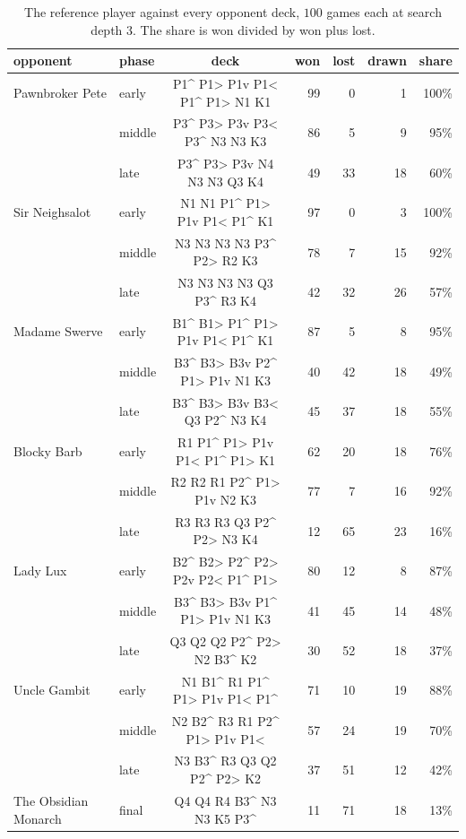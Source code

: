 \documentclass[11pt,a4paper]{article}
\begin{document}
\begin{table}[ht]
\centering
\small
\begin{tabular}{llcrrrr}
\toprule
opponent & phase & deck & won & lost & drawn & share \\
\midrule
Pawnbroker Pete & early & P1\^{} P1> P1v P1< P1\^{} P1> N1 K1 & 99 & 0 & 1 & 100\% \\
 & middle & P3\^{} P3> P3v P3< P3\^{} N3 N3 K3 & 86 & 5 & 9 & 95\% \\
 & late & P3\^{} P3> P3v N4 N3 N3 Q3 K4 & 49 & 33 & 18 & 60\% \\
\addlinespace
Sir Neighsalot & early & N1 N1 P1\^{} P1> P1v P1< P1\^{} K1 & 97 & 0 & 3 & 100\% \\
 & middle & N3 N3 N3 N3 P3\^{} P2> R2 K3 & 78 & 7 & 15 & 92\% \\
 & late & N3 N3 N3 N3 Q3 P3\^{} R3 K4 & 42 & 32 & 26 & 57\% \\
\addlinespace
Madame Swerve & early & B1\^{} B1> P1\^{} P1> P1v P1< P1\^{} K1 & 87 & 5 & 8 & 95\% \\
 & middle & B3\^{} B3> B3v P2\^{} P1> P1v N1 K3 & 40 & 42 & 18 & 49\% \\
 & late & B3\^{} B3> B3v B3< Q3 P2\^{} N3 K4 & 45 & 37 & 18 & 55\% \\
\addlinespace
Blocky Barb & early & R1 P1\^{} P1> P1v P1< P1\^{} P1> K1 & 62 & 20 & 18 & 76\% \\
 & middle & R2 R2 R1 P2\^{} P1> P1v N2 K3 & 77 & 7 & 16 & 92\% \\
 & late & R3 R3 R3 Q3 P2\^{} P2> N3 K4 & 12 & 65 & 23 & 16\% \\
\addlinespace
Lady Lux & early & B2\^{} B2> P2\^{} P2> P2v P2< P1\^{} P1> & 80 & 12 & 8 & 87\% \\
 & middle & B3\^{} B3> B3v P1\^{} P1> P1v N1 K3 & 41 & 45 & 14 & 48\% \\
 & late & Q3 Q2 Q2 P2\^{} P2> N2 B3\^{} K2 & 30 & 52 & 18 & 37\% \\
\addlinespace
Uncle Gambit & early & N1 B1\^{} R1 P1\^{} P1> P1v P1< P1\^{} & 71 & 10 & 19 & 88\% \\
 & middle & N2 B2\^{} R3 R1 P2\^{} P1> P1v P1< & 57 & 24 & 19 & 70\% \\
 & late & N3 B3\^{} R3 Q3 Q2 P2\^{} P2> K2 & 37 & 51 & 12 & 42\% \\
\addlinespace
The Obsidian Monarch & final & Q4 Q4 R4 B3\^{} N3 N3 K5 P3\^{} & 11 & 71 & 18 & 13\% \\
\bottomrule
\end{tabular}
\caption{The reference player against every opponent deck, $100$ games each at search depth $3$. The share is won divided by won plus lost.}
\label{tab:balance}
\end{table}
\end{document}
